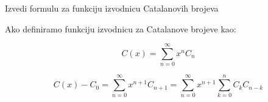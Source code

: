 \documentclass[exam.tex]{subfiles}
\begin{document}
	\begin{subtask}
		Izvedi formulu za funkciju izvodnicu Catalanovih brojeva \\
	\end{subtask}
	
	Ako definiramo funkciju izvodnicu za Catalanove brojeve kao:
	
	\[ C(x) = \sum\limits^\infty_{n=0} x^n C_n \]
	
	\[ C(x) - C_0 = \sum\limits^\infty_{n=0} x^{n + 1} C_{n + 1} = \sum\limits^\infty_{n=0} x^{n + 1} \sum\limits^n_{k=0} C_k C_{n - k} \]
\end{document}
